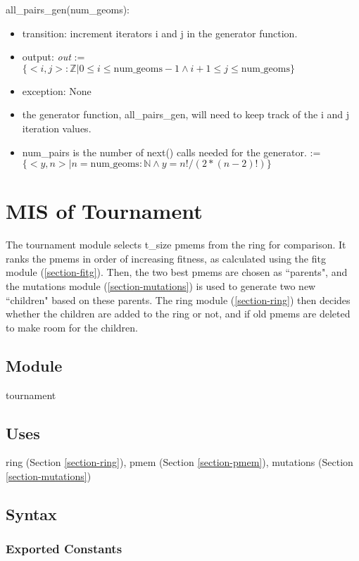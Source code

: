 \documentclass[12pt, titlepage]{article}
\begin{document}
\noindent all\_pairs\_gen(num\_geoms):
\begin{itemize}
	\item transition: increment iterators i and j in the generator function.
	\item output: \textit{out} := $\{<i,j>: \mathbb{Z} | 0 \leq i \leq 
	\text{num\_geoms}-1 \land i+1 \leq j \leq \text{num\_geoms}\}$
	\item exception: None
	\item the generator function, all\_pairs\_gen, will need to keep track of 
	the i and j iteration values.
	\item num\_pairs is the number of next() calls needed for the generator. := 
	$\{<y,n> | n = \text{num\_geoms} : \mathbb{N} \land y = n!/(2*(n-2)!) \}$
\end{itemize}


\section{MIS of Tournament} \label{section-tournament} 

The tournament module selects t\_size pmems from the ring for comparison. It 
ranks the pmems in order of increasing fitness, as calculated using the fitg 
module (\ref{section-fitg}). Then, the two best pmems are chosen as ``parents", 
and the mutations module (\ref{section-mutations}) is used to generate two new 
``children" based on these parents. The ring module (\ref{section-ring}) then 
decides whether the children are added to the ring or not, and if old pmems are 
deleted to make room for the children.

\subsection{Module}

tournament

\subsection{Uses}

ring (Section \ref{section-ring}),
pmem (Section \ref{section-pmem}),
mutations (Section \ref{section-mutations})

\subsection{Syntax}

\subsubsection{Exported Constants}
\end{document}
